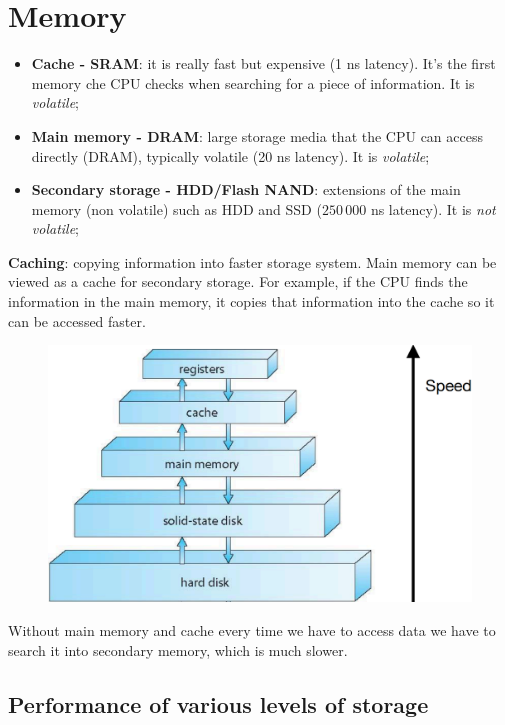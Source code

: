 \newpage
\section{Memory}

\begin{itemize}
    \item \textbf{Cache - SRAM}: it is really fast but expensive (1 ns latency). It’s the first memory che CPU checks when
searching for a piece of information. It is \textit{volatile};
    \item \textbf{Main memory - DRAM}: large storage media that the CPU can access directly (DRAM), typically volatile
(20 ns latency). It is \textit{volatile};
    \item \textbf{Secondary storage - HDD/Flash NAND}: extensions of the main memory (non volatile) such as HDD and SSD
($250\,000$ ns latency). It is  \textit{not volatile};
\end{itemize}

\textbf{Caching}: copying information into faster storage system. Main memory can be viewed as a cache
for secondary storage.
For example, if the CPU finds the information in the main memory, it copies that information into
the cache so it can be accessed faster.

\begin{figure}[htbp]
    \centering
    \includegraphics[scale=0.25]{img/mem.png}
\end{figure}

Without main memory and cache every time we have to access data we have to search it into
secondary memory, which is much slower.

\subsection{Performance of various levels of storage}



